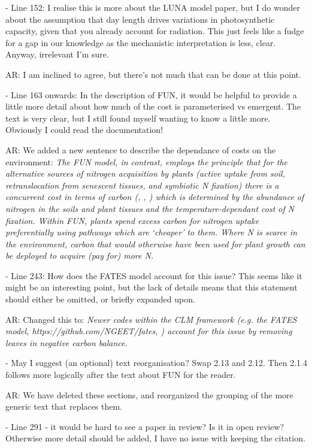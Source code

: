\documentclass{article}
\begin{document}
- Line 152: I realise this is more about the LUNA model paper, but I do wonder about the assumption that day length drives variations in photosynthetic capacity, given that you already account for radiation. This just feels like a fudge for a gap in our knowledge as the mechanistic interpretation is less, clear. Anyway, irrelevant I'm sure. 

\textsf{AR: I am inclined to agree, but there's not much that can be done at this point.} 

- Line 163 onwards: In the description of FUN, it would be helpful to provide a little more detail about how much of the cost is parameterised vs emergent. The text is very clear, but I still found myself wanting to know a little more. Obviously I could read the documentation! 

\textsf{AR: We added a new sentence to describe the dependance of costs on the environment: \emph{The FUN model, in contrast, employs the principle that for the alternative sources of nitrogen acquisition by plants (active uptake from soil, retranslocation from senescent tissues, and symbiotic N fixation) there is a concurrent cost in terms of carbon (\cite{bloom1985}, \cite{jiang2017}, \cite{terrer2018}) which is determined by the abundance of nitrogen in the soils and plant tissues and the temperature-dependant cost of N fixation. Within FUN, plants spend excess carbon for nitrogen uptake preferentially using pathways which are `cheaper' to them. Where N is scarce in the environment, carbon that would otherwise have been used for plant growth can be deployed to acquire (pay for) more N. }}

- Line 243: How does the FATES model account for this issue? This seems like it might be an interesting point, but the lack of details means that this statement should either be omitted, or briefly expanded upon. 

\textsf{AR: Changed this to: \emph{Newer codes within the CLM framework (e.g. the FATES model, https://github.com/NGEET/fates, \cite{fisher2015}) account for this issue by removing leaves in negative carbon balance.}}

- May I suggest (an optional) text reorganisation? Swap 2.13 and 2.12. Then 2.1.4 follows more logically after the text about FUN for the reader. 

\textsf{AR: We have deleted these sections, and reorganized the grouping of the more generic text that replaces them.}

- Line 291 - it would be hard to see a paper in review? Is it in open review? Otherwise more detail should be added, I have no issue with keeping the citation. 
\end{document}

